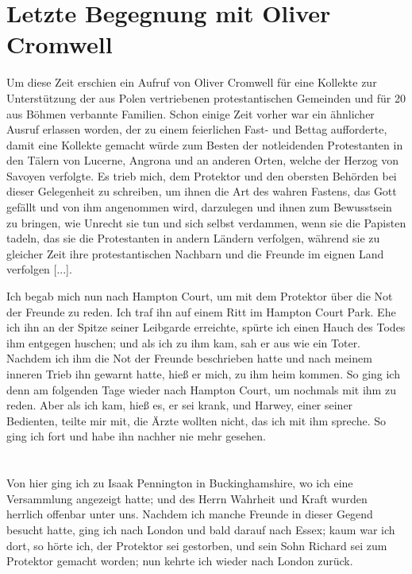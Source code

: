 \section{Letzte Begegnung mit Oliver Cromwell}

Um diese Zeit erschien ein Aufruf von Oliver 
Cromwell für
eine Kollekte zur Unterstützung der aus Polen vertriebenen 
protestantischen Gemeinden  und 
für 20 aus Böhmen verbannte
Familien. Schon einige Zeit vorher war ein ähnlicher Ausruf
erlassen worden, der zu einem feierlichen Fast- und Bettag 
aufforderte, damit eine Kollekte gemacht würde zum Besten der 
notleidenden Protestanten in den Tälern von 
Lucerne, Angrona und
an anderen Orten, welche der Herzog von 
Savoyen verfolgte.
Es trieb mich, dem Protektor und den obersten Behörden bei
dieser Gelegenheit zu schreiben, um ihnen die Art des wahren
Fastens, das Gott gefällt und von ihm angenommen wird, 
darzulegen und ihnen zum Bewusstsein zu bringen, wie Unrecht sie
tun und sich selbst verdammen, wenn sie die 
Papisten tadeln,
das sie die Protestanten in andern Ländern 
verfolgen, während
sie zu gleicher Zeit ihre protestantischen Nachbarn und die
Freunde im eignen Land verfolgen [...].


Ich begab mich nun nach Hampton Court, um mit dem
Protektor über die Not der Freunde zu reden. Ich traf ihn auf
einem Ritt im Hampton Court Park. 
Ehe ich ihn an der Spitze
seiner Leibgarde erreichte, spürte ich einen Hauch des Todes
ihm entgegen huschen; und als ich zu ihm kam, sah er aus wie
ein Toter. Nachdem ich ihm die Not der Freunde beschrieben
hatte und nach meinem inneren Trieb ihn gewarnt hatte, hieß
er mich, zu ihm heim kommen. So ging ich denn am folgenden
Tage wieder nach Hampton Court, um nochmals mit ihm zu
reden. Aber als ich kam, hieß es, er sei krank, und Harwey,
einer seiner Bedienten, teilte mir mit, die Ärzte wollten nicht,
das ich mit ihm spreche. So ging ich fort und habe ihn nachher
nie mehr gesehen.

\section{}


Von hier ging ich zu Isaak Pennington 
in Buckinghamshire, 
wo ich eine Versammlung angezeigt hatte; und des Herrn 
Wahrheit und Kraft wurden herrlich offenbar unter uns. Nachdem
ich manche Freunde in dieser Gegend besucht hatte, ging ich
nach London und bald darauf nach 
Essex; kaum war ich dort,
so hörte ich, der Protektor sei gestorben, und sein Sohn 
Richard
sei zum Protektor gemacht worden; nun kehrte ich wieder nach
London zurück.


